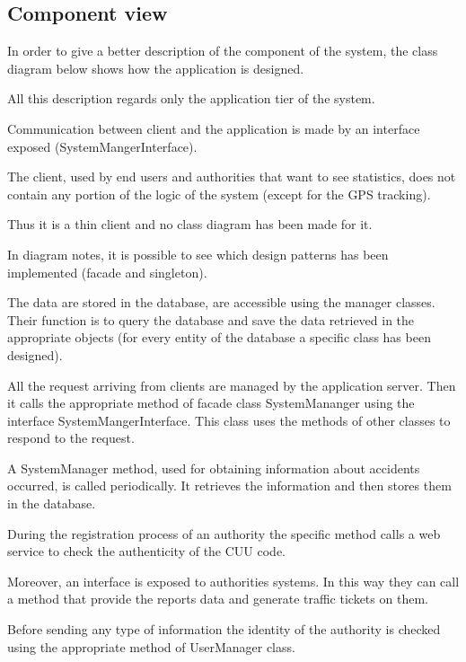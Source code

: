 \newpage
\subsection{Component view}
In order to give a better description of the component of the system, the class diagram below shows how the application is designed.

All this description regards only the application tier of the system.

Communication between client and the application is made by an interface exposed (SystemMangerInterface).
 
The client, used by end users and authorities that want to see statistics, does not contain any portion of the logic of the system (except for the GPS tracking). 

Thus it is a thin client and no class diagram has been made for it.

In diagram notes, it is possible to see which design patterns has been implemented (facade and singleton).

The data are stored in the database, are accessible using the manager classes. Their function is to query the database and save the data retrieved in the appropriate objects (for every entity of the database a specific class has been designed).

All the request arriving from clients are managed by the application server. Then it calls the appropriate method of facade class SystemMananger using the interface SystemMangerInterface. This class uses the methods of other classes to respond to the request.

A SystemManager method, used for obtaining information about accidents occurred, is called periodically. It retrieves the information and then stores them in the database.

During the registration process of an authority the specific method calls a web service to check the authenticity of the CUU code.

Moreover, an interface is exposed to authorities systems. In this way they can call a method that provide the reports data and generate traffic tickets on them. 

Before sending any type of information the identity of the authority is checked using the appropriate method of UserManager class.
\newpage

